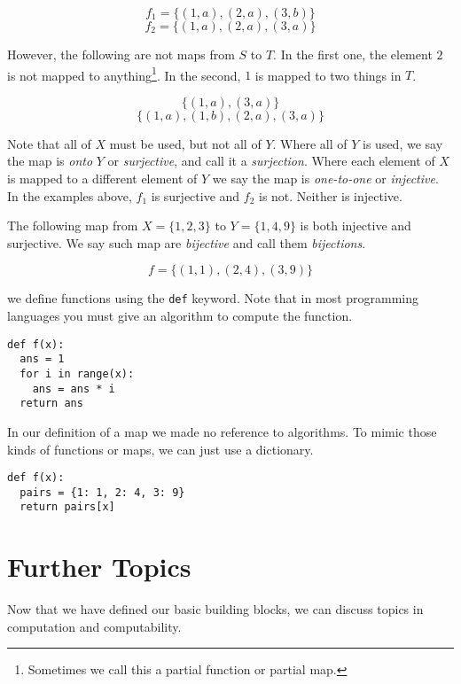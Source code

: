 \documentclass{iansnotes}
\begin{document}
  \[ f_1 = \{ (1, a), (2, a), (3, b) \} \]
  \[ f_2 = \{ (1, a), (2, a), (3, a) \} \]

  However, the following are not maps from $S$ to $T$.
  In the first one, the element $2$ is not mapped to anything\footnote{Sometimes we call this a partial function or partial map.}.
  In the second, $1$ is mapped to two things in $T$.

  \[ \{ (1, a), (3, a) \} \]
  \[ \{ (1, a), (1, b), (2, a), (3, a) \} \]

  Note that all of $X$ must be used, but not all of $Y$.
  Where all of $Y$ is used, we say the map is \emph{onto} $Y$ or \emph{surjective}, and call it a \emph{surjection}.
  Where each element of $X$ is mapped to a different element of $Y$ we say the map is \emph{one-to-one} or \emph{injective}.
  In the examples above, $f_1$ is surjective and $f_2$ is not.
  Neither is injective.

  The following map from $X = \{1, 2, 3\}$ to $Y = \{1, 4, 9\}$ is both injective and surjective.
  We say such map are \emph{bijective} and call them \emph{bijections}.

  \[ f = \{(1,1), (2,4), (3,9) \} \]
  
   we define functions using the \texttt{def} keyword.
  Note that in most programming languages you must give an algorithm to compute the function.
  \begin{verbatim}
def f(x):
  ans = 1
  for i in range(x):
    ans = ans * i
  return ans
  \end{verbatim}
  In our definition of a map we made no reference to algorithms.
  To mimic those kinds of functions or maps, we can just use a dictionary.
  \begin{verbatim}
def f(x):
  pairs = {1: 1, 2: 4, 3: 9}
  return pairs[x]
  \end{verbatim}

\section{Further Topics}
  Now that we have defined our basic building blocks, we can discuss topics in computation and computability.
\end{document}

